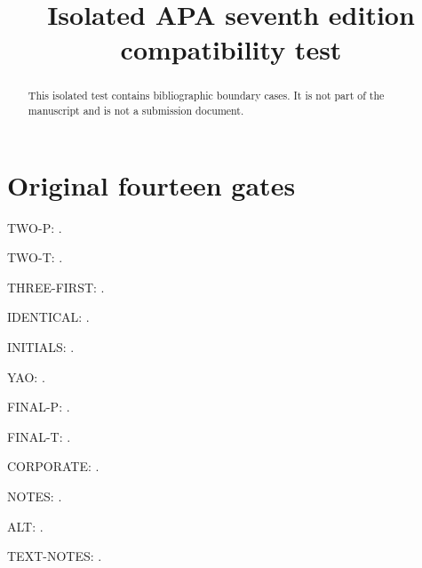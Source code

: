 \documentclass[a4paper,fleqn]{cas-dc}
\newcommand{\restoretestcolumns}{%
  \normalfont\setlength{\columnsep}{18pt}%
  \setlength{\columnwidth}{\dimexpr(\textwidth-\columnsep)/2\relax}%
  \setlength{\hsize}{\columnwidth}\setlength{\linewidth}{\columnwidth}}
\begin{document}
\let\WriteBookmarks\relax
\renewcommand{\printorcid}{}
\title{Isolated APA seventh edition compatibility test}
\begin{abstract}This isolated test contains bibliographic boundary cases.
It is not part of the manuscript and is not a submission document.\end{abstract}
\maketitle\restoretestcolumns
\setlength{\emergencystretch}{1em}
\section{Original fourteen gates}
TWO-P: \citep{two}.\par
TWO-T: \citet{two}.\par
THREE-FIRST: \citep{three}.\par
IDENTICAL: \citep{identicalB,identicalA}.\par
INITIALS: \citep{chen2024agentverse,chen2024reconcile}.\par
YAO: \citep{yao2023react,yao2023tree_of_thoughts}.\par
FINAL-P: \citep{lastA,lastB}.\par
FINAL-T: \citet{lastA,lastB}.\par
CORPORATE: \citep{corporate}.\par
NOTES: \citep[see][p.~12]{two}.\par
ALT: \citealp{two}.\par
TEXT-NOTES: \citet[p.~12]{two}.\par
\nocite{*}

\printbibliography
\end{document}
